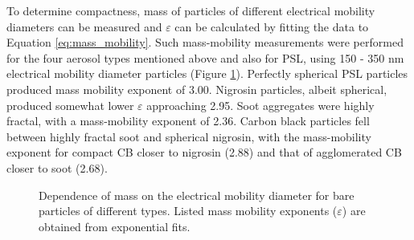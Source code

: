 \documentclass[12pt,authoryear]{elsarticle}
\begin{document}
To determine compactness, mass of particles of different electrical mobility diameters can be measured and $\varepsilon$ can be calculated by fitting the data to Equation \ref{eq:mass_mobility}. Such mass-mobility measurements were performed for the four aerosol types mentioned above and also for PSL, using 150 - 350 nm electrical mobility diameter particles (Figure \ref{fig:mass_mobility}). Perfectly spherical PSL particles produced mass mobility exponent of 3.00. Nigrosin particles, albeit spherical, produced  somewhat lower $\varepsilon$ approaching 2.95. Soot aggregates were highly fractal, with a mass-mobility exponent of 2.36. Carbon black particles fell between highly fractal soot and spherical nigrosin, with the mass-mobility exponent for compact CB closer to nigrosin (2.88) and that of agglomerated CB closer to soot (2.68).

\begin{figure}[htp]
    \centering
    \caption{Dependence of mass on the electrical mobility diameter for bare particles of different types. Listed mass mobility exponents ($\varepsilon$) are obtained from exponential fits.}
    \label{fig:mass_mobility}
\end{figure}
\end{document}
